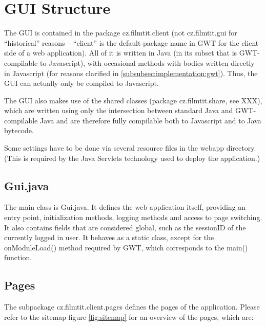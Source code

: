 \section{GUI Structure}

The GUI is contained in the package cz.filmtit.client (not cz.filmtit.gui for ``historical'' reasons -- ``client'' is the default package name in GWT for the client side of a web application). All of it is written in Java (in its subset that is GWT-compilable to Javascript), with occasional methods with bodies written directly in Javascript (for reasons clarified in \ref{subsubsec:implementation:gwt}). Thus, the GUI can actually only be compiled to Javascript.

The GUI also makes use of the shared classes (package cz.filmtit.share, see XXX), which are written using only the intersection between standard Java and GWT-compilable Java and are therefore fully compilable both to Javascript and to Java bytecode.

Some settings have to be done via several resource files in the webapp directory. (This is required by the Java Servlets technology used to deploy the application.)


\subsection{Gui.java}

The main class is Gui.java. It defines the web application itself, providing an entry point, initialization methods, logging methods and access to page switching. It also contains fields that are considered global, such as the sessionID of the currently logged in user.
It behaves as a static class, except for the onModuleLoad() method required by GWT, which corresponds to the main() function.

\subsection{Pages}

The subpackage cz.filmtit.client.pages defines the pages of the application.
Please refer to the sitemap figure \ref{fig:sitemap} for an overview of the pages, which are:

